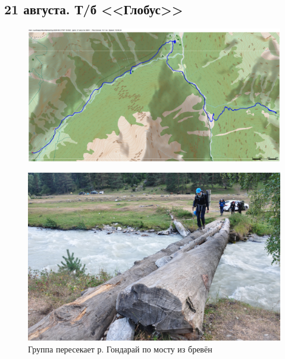 \subsection{21 августа. Т/б <<Глобус>>}

\begin{figure}[h!]
	\centering
	\includegraphics[angle=0, width=0.3\linewidth]{../pics/mini_maps/21}
	\label{fig:mini_21}
\end{figure}

\begin{figure}[h]
	\centering
	\includegraphics[width=0.7\linewidth]{../pics/DSC_1167}
	\caption{Группа пересекает р. Гондарай по мосту из бревён}
	\label{fig:hondaray}
\end{figure}
\newpage